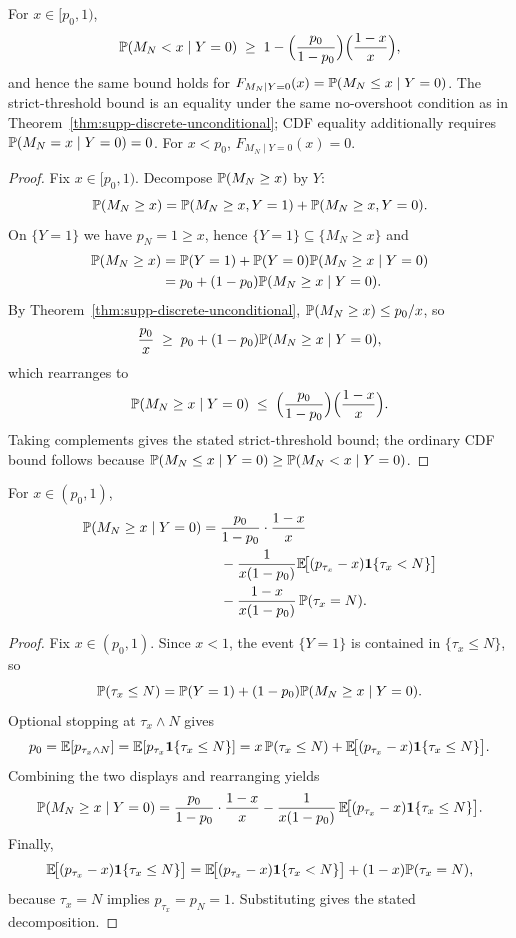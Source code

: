 \begin{theorem} \label{thm:supp-discrete-conditional}
For $x\in[p_0,1)$,
\[
\P(M_N<x\mid Y=0)
\;\ge\;
1-\Big(\frac{p_0}{1-p_0}\Big)\Big(\frac{1-x}{x}\Big),
\]
and hence the same bound holds for $F_{M_N\mid Y=0}(x)=\P(M_N\le x\mid Y=0)$.
The strict-threshold bound is an equality under the same no-overshoot condition as in Theorem~\ref{thm:supp-discrete-unconditional}; CDF equality additionally requires $\P(M_N=x\mid Y=0)=0$.
For $x<p_0$, $F_{M_N\mid Y=0}(x)=0$.
\end{theorem}

\begin{proof}
Fix $x\in[p_0,1)$. Decompose $\P(M_N\ge x)$ by $Y$:
\[
\P(M_N\ge x)=\P(M_N\ge x, Y=1)+\P(M_N\ge x, Y=0).
\]
On $\{Y=1\}$ we have $p_N=1\ge x$, hence $\{Y=1\}\subseteq\{M_N\ge x\}$ and
\begin{align*}
\P(M_N\ge x)
&=\P(Y=1)+\P(Y=0)\P(M_N\ge x\mid Y=0) \\
&=p_0+(1-p_0)\P(M_N\ge x\mid Y=0).
\end{align*}
By Theorem~\ref{thm:supp-discrete-unconditional}, $\P(M_N\ge x)\le p_0/x$, so
\[
\frac{p_0}{x}\;\ge\; p_0 + (1-p_0)\P(M_N\ge x\mid Y=0),
\]
which rearranges to
\[
\P(M_N\ge x\mid Y=0)\;\le\;\Big(\frac{p_0}{1-p_0}\Big)\Big(\frac{1-x}{x}\Big).
\]
Taking complements gives the stated strict-threshold bound; the ordinary CDF bound follows because $\P(M_N\le x\mid Y=0)\ge\P(M_N<x\mid Y=0)$.
\end{proof}

\begin{proposition}
For $x\in(p_0,1)$,
\begin{align*}
\P(M_N\ge x\mid Y=0)
={}&\frac{p_0}{1-p_0}\cdot\frac{1-x}{x} \\
&-\frac{1}{x(1-p_0)}
  \E\!\big[(p_{\tau_x}-x)\mathbf 1\{\tau_x<N\}\big] \\
&-\frac{1-x}{x(1-p_0)}\,\P(\tau_x=N).
\end{align*}
\end{proposition}

\begin{proof}
Fix $x\in(p_0,1)$. Since $x<1$, the event $\{Y=1\}$ is contained in $\{\tau_x\le N\}$, so
\[
\P(\tau_x\le N)=\P(Y=1)+(1-p_0)\P(M_N\ge x\mid Y=0).
\]
Optional stopping at $\tau_x\wedge N$ gives
\[
p_0=\E[p_{\tau_x\wedge N}]
=\E[p_{\tau_x}\mathbf 1\{\tau_x\le N\}]
=x\,\P(\tau_x\le N)+\E\!\big[(p_{\tau_x}-x)\mathbf 1\{\tau_x\le N\}\big].
\]
Combining the two displays and rearranging yields
\[
\P(M_N\ge x\mid Y=0)
=\frac{p_0}{1-p_0}\cdot\frac{1-x}{x}
-\frac{1}{x(1-p_0)}\,\E\!\big[(p_{\tau_x}-x)\mathbf 1\{\tau_x\le N\}\big].
\]
Finally,
\[
\E\!\big[(p_{\tau_x}-x)\mathbf 1\{\tau_x\le N\}\big]
=\E\!\big[(p_{\tau_x}-x)\mathbf 1\{\tau_x< N\}\big]+(1-x)\P(\tau_x=N),
\]
because $\tau_x=N$ implies $p_{\tau_x}=p_N=1$.
Substituting gives the stated decomposition.
\end{proof}

